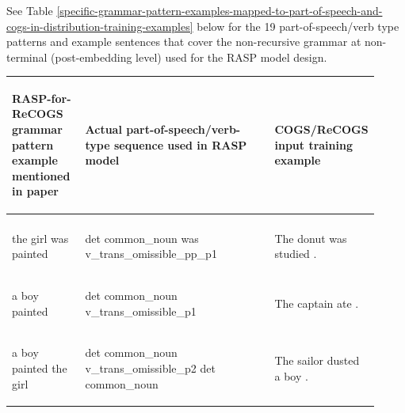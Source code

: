 \documentclass[11pt]{article}
\begin{document}
See Table \ref{specific-grammar-pattern-examples-mapped-to-part-of-speech-and-cogs-in-distribution-training-examples} below for the 19 part-of-speech/verb type patterns and example sentences that cover the non-recursive grammar at non-terminal (post-embedding level) used for the RASP model design.

\clearpage
\onecolumn
\begin{table}
\centering
\begin{tabular}{p{0.2\linewidth} p{0.52\linewidth} p{0.2\linewidth}}
\hline
\begin{small}\textbf{RASP-for-ReCOGS grammar pattern example mentioned in paper}\end{small} & \begin{small}\textbf{Actual part-of-speech/verb-type sequence used in RASP model}\end{small} & \begin{small}\textbf{COGS/ReCOGS input training example}\end{small}\\
\hline
\begin{small}\end{small} & \begin{small}\end{small} & \begin{small}\end{small} \\
\begin{small}the girl was painted\end{small} & \begin{small}det common\_noun was v\_trans\_omissible\_pp\_p1 \end{small} & \begin{small}The donut was studied .\end{small} \\
\begin{small}a boy painted\end{small} & \begin{small}det common\_noun v\_trans\_omissible\_p1 \end{small} & \begin{small}The captain ate .\end{small} \\
\begin{small}a boy painted the girl\end{small} & \begin{small}det common\_noun v\_trans\_omissible\_p2 det common\_noun \end{small} & \begin{small}The sailor dusted a boy .\end{small} \\

\end{tabular}
\end{table}
\end{document}
